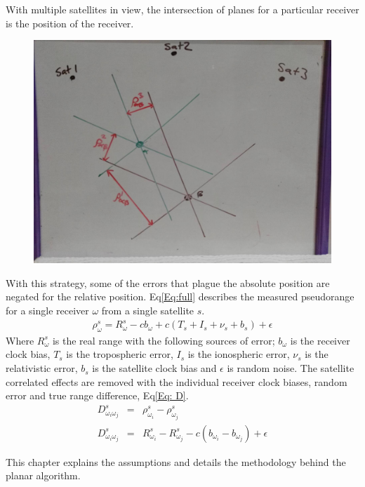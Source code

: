 With multiple satellites in view, the intersection of planes for a particular receiver is the position of the receiver.
\begin{figure}[h]
\centering
\caption{}
\label{fig:overall_multiS_duelR}
\includegraphics[width=0.7\linewidth]{ChapterLiteratureReview/overall_multiS_duelR.jpg}
\end{figure}

With this strategy, some of the errors that plague the absolute position are negated for the relative position. Eq\eqref{Eq:full} describes the measured pseudorange for a single receiver $\omega$ from a single satellite $s$.
\begin{eqnarray}
\rho_\omega^s = R_\omega^s -cb_\omega + c(T_s + I_s+\nu_s+b_s) + \epsilon \label{Eq:full}
\end{eqnarray}
Where $R_\omega^s$ is the real range with the following sources of error; $b_\omega$ is the receiver clock bias, $T_s$ is the tropospheric error, $I_s$ is the ionospheric error, $\nu_s$ is the relativistic error, $b_s$ is the satellite clock bias and $\epsilon$ is random noise. The satellite correlated effects are removed with the individual receiver clock biases, random error and true range difference, Eq\eqref{Eq: D}.  
\begin{eqnarray}
D_{\omega_i\omega_j}^s &=& \rho_{\omega_i}^s - \rho_{\omega_j}^s \\
D_{\omega_i\omega_j}^s &=& R_{\omega_i}^s-R_{\omega_j}^s -c(b_{\omega_i}-b_{\omega_j}) + \epsilon \label{Eq: D}
\end{eqnarray}

This chapter explains the assumptions and details the methodology behind the planar algorithm.












